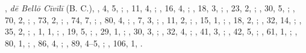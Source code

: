 
\label{passages}
\markthird{}


\begin{autindex}


,
  \subitem \emph{dē Bellō Cīvīlī} (B. C.),
    ,   4,  5, ;
    ,  11,  4, ;
    ,  16,  4, ;
    ,  18,  3, ;
    ,  23,  2, ;
    ,  30,  5, ;
    ,  70,  2, ;
    ,  73,  2, ;
    ,  74,  7, ;
    ,  80,  4, ;
    ,   7,  3, ;
    ,  11,  2, ;
    ,  15,  1, ;
    ,  18,  2, ;
    ,  32, 14, ;
    ,  35,  2, ;
    ,   1,  1, ;
    ,  19,  5, ;
    ,  29,  1, ;
    ,  30,  3, ;
    ,  32,  4, ;
    ,  41,  3, ;
    ,  42,  5, ;
    ,  61,  1, ;
    ,  80,  1, ;
    ,  86,  4, ;
    ,  89,  4–5, ;
    , 106,  1, .


\end{autindex}
